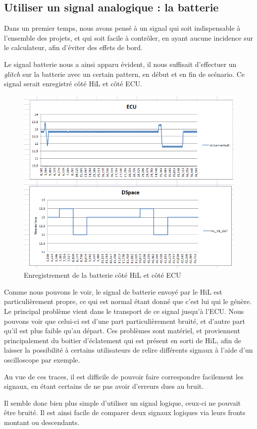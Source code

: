 \subsection{Utiliser un signal analogique : la batterie}
Dans un premier temps, nous avons pensé à un signal qui soit indispensable à l'ensemble des projets, et qui soit facile à contrôler, en ayant aucune incidence sur le calculateur, afin d'éviter des effets de bord. 

Le signal batterie nous a ainsi apparu évident, il nous suffisait d'effectuer un \textit{glitch} sur la batterie avec un certain pattern, en début et en fin de scénario. Ce signal serait enregistré côté HiL et côté ECU.
\begin{figure}[h]
\centering
\vspace{-10px}
\includegraphics[width=0.61\linewidth]{contents/images/sync1}
\caption{Enregistrement de la batterie côté HiL et côté ECU}
\label{fig:sync-traces-vb}
\end{figure}
Comme nous pouvons le voir, le signal de batterie envoyé par le HiL est particulièrement propre, ce qui est normal étant donné que c'est lui qui le génère. Le principal problème vient dans le transport de ce signal jusqu'à l'ECU. Nous pouvons voir que celui-ci est d'une part particulièrement bruité, et d'autre part qu'il est plus faible qu'au départ. Ces problèmes sont matériel, et proviennent principalement du boitier d'éclatement qui est présent en sorti de HiL, afin de laisser la possibilité à certains utilisateurs de relire différents signaux à l'aide d'un oscilloscope par exemple. 

Au vue de ces traces, il est difficile de pouvoir faire correspondre facilement les signaux, en étant certains de ne pas avoir d'erreurs dues au bruit. 

Il semble donc bien plus simple d'utiliser un signal logique, ceux-ci ne pouvait être bruité. Il est ainsi facile de comparer deux signaux logiques via leurs fronts montant ou descendants. 


